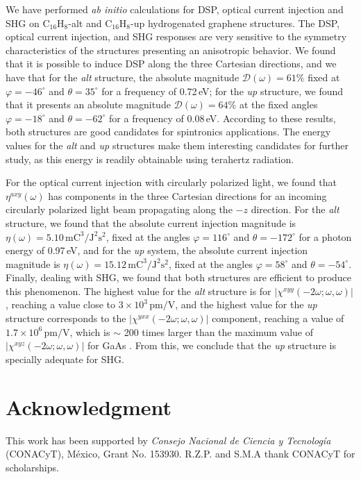 \documentclass[pss]{wiley2sp} %
\begin{document}
We have performed \emph{ab initio} calculations for DSP, optical current
injection and SHG on C$_{16}$H$_{8}$-alt and C$_{16}$H$_{8}$-up hydrogenated
graphene structures. The DSP, optical current injection, and SHG responses are
very sensitive to the symmetry characteristics of the structures presenting an
anisotropic behavior. We found that it is possible to induce DSP along the
three Cartesian directions, and we have that for the \emph{alt} structure, the
absolute magnitude $\mathcal{D}(\omega)=61\%$ fixed at $\varphi=-46^{\circ}$ and
$\theta=35^{\circ}$ for a frequency of 0.72\,eV; for the \emph{up} structure, we
found that it presents an absolute magnitude $\mathcal{D}(\omega)=64\%$ at the
fixed angles $\varphi=-18^{\circ}$ and $\theta=-62^{\circ}$ for a frequency of
0.08\,eV. According to these results, both structures are good candidates for
spintronics applications. The energy values for the \emph{alt} and \emph{up}
structures make them interesting candidates for further study, as this energy is
readily obtainable using terahertz radiation.

For the optical current injection with circularly polarized light, we found
that $\eta^{axy}(\omega)$ has components in the three Cartesian directions
for an incoming circularly polarized light beam propagating along the $-z$
direction. For the \emph{alt} structure, we found that the absolute current
injection magnitude is
$\eta(\omega)=5.10\,\mathrm{mC}^{3}/\mathrm{J}^{2}\mathrm{s}^{2}$, fixed at the
angles $\varphi=116^{\circ}$ and $\theta=-172^{\circ}$ for a photon energy of
0.97\,eV, and for the \emph{up} system, the absolute current injection magnitude
is $\eta(\omega)=15.12\,\mathrm{mC}^{3}/\mathrm{J}^{2}\mathrm{s}^{2}$, fixed at
the angles $\varphi=58^{\circ}$ and $\theta=-54^{\circ}$. Finally, dealing with
SHG, we found that both structures are efficient to produce this phenomenon.
The highest value for the \emph{alt} structure is for 
$|\chi^{xyy}(-2\omega;\omega,\omega)|$, reaching a value close to
$3\times10^{3}\,\mathrm{pm/V}$, and the highest value for the \emph{up} structure
corresponds to the $|\chi^{yxx}(-2\omega;\omega,\omega)|$
 component, reaching a
value of $1.7\times10^{6}\,\mathrm{pm/V}$,
which is $\sim$ 200 times larger than the maximum value of
$|\chi^{xyz}(-2\omega;\omega,\omega)|$ for
GaAs \cite{bergfeldPRL03}.
From this, we conclude that
the \emph{up} structure is specially adequate for SHG.


\section{Acknowledgment} %

This work has been supported by \emph{Consejo Nacional de Ciencia y
Tecnolog\'ia} (CONACyT), M\'exico, Grant No. 153930.
R.Z.P. and S.M.A thank CONACyT for scholarships.



\end{document}
